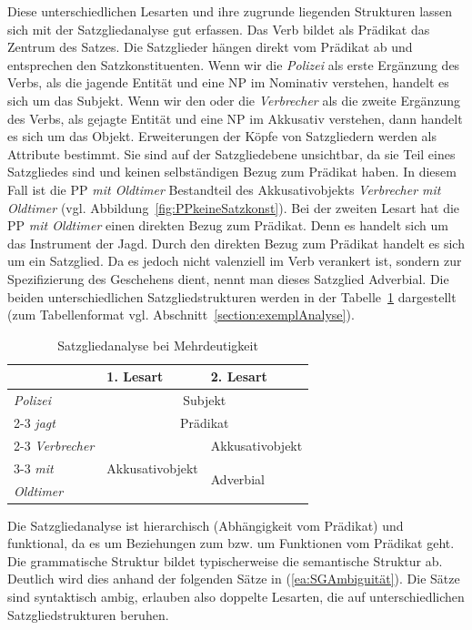 Diese unterschiedlichen Lesarten und ihre zugrunde liegenden Strukturen lassen sich mit der Satzgliedanalyse gut erfassen. Das Verb bildet als Prädikat das Zentrum des Satzes. Die Satzglieder hängen direkt vom Prädikat ab und entsprechen den Satzkonstituenten. Wenn wir die \textit{Polizei} als erste Ergänzung des Verbs, als die jagende Entität und eine NP im Nominativ verstehen, handelt es sich um das Subjekt. Wenn wir den oder die \textit{Verbrecher} als die zweite Ergänzung des Verbs, als gejagte Entität und eine NP im Akkusativ verstehen, dann handelt es sich um das Objekt. Erweiterungen der Köpfe von Satzgliedern werden als Attribute bestimmt. Sie sind auf der Satzgliedebene unsichtbar, da sie Teil eines Satzgliedes sind und keinen selbständigen Bezug zum Prädikat haben. In diesem Fall ist die PP \textit{mit Oldtimer} Bestandteil des Akkusativobjekts \textit{Verbrecher mit Oldtimer} (vgl. Abbildung~\ref{fig:PPkeineSatzkonst}). Bei der zweiten Lesart hat die PP \textit{mit Oldtimer} einen direkten Bezug zum Prädikat. Denn es handelt sich um das Instrument der Jagd. Durch den direkten Bezug zum Prädikat handelt es sich um ein Satzglied. Da es jedoch nicht valenziell im Verb verankert ist, sondern zur Spezifizierung des Geschehens dient, nennt man dieses Satzglied Adverbial. Die beiden unterschiedlichen Satzgliedstrukturen werden in der Tabelle~\ref{tab:SGATabelleAmbiguität} dargestellt (zum Tabellenformat vgl. Abschnitt~\ref{section:exemplAnalyse}).


\begin{table}
  \centering
  \begin{tabular}{l|l|l}
     & 1. Lesart & 2. Lesart \\
    \hline
    \textit{Polizei} & \multicolumn{2}{c}{Subjekt}\\
    \cline{2-3} 
    \textit{jagt} & \multicolumn{2}{c}{Prädikat}\\
    \cline{2-3}
    \textit{Verbrecher} & \multirow{3}{*}{Akkusativobjekt} & Akkusativobjekt \\
    \cline{3-3}
    \textit{mit} & & \multirow{2}{*}{Adverbial}\\
    \textit{Oldtimer} & & \\ 
    \hline
  \end{tabular}
  \caption{Satzgliedanalyse bei Mehrdeutigkeit}
  \label{tab:SGATabelleAmbiguität}
\end{table}

Die Satzgliedanalyse ist hierarchisch (Abhängigkeit vom Prädikat) und funktional, da es um Beziehungen zum bzw. um Funktionen vom Prädikat geht. Die grammatische Struktur bildet typischerweise die semantische Struktur ab. Deutlich wird dies anhand der folgenden Sätze in (\ref{ea:SGAmbiguität}). Die Sätze sind syntaktisch ambig, erlauben also doppelte Lesarten, die auf unterschiedlichen Satzgliedstrukturen beruhen.       

